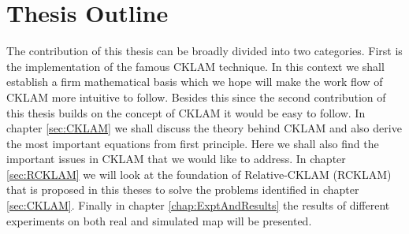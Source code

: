 \section{Thesis Outline}
The contribution of this thesis can be broadly divided into two categories. First is the implementation of the famous CKLAM technique. In this context we shall establish a firm mathematical basis which we hope will make the work flow of CKLAM more intuitive to follow. Besides this since the second contribution of this thesis builds on the concept of CKLAM it would be easy to follow. In chapter \ref {sec:CKLAM} we shall discuss the theory behind CKLAM and also derive the most important equations from first principle. Here we shall also find the important issues in CKLAM that we would like to address. In chapter \ref{sec:RCKLAM} we will look at the foundation of Relative-CKLAM (RCKLAM) that is proposed in this theses to solve the problems identified in chapter \ref{sec:CKLAM}. Finally in chapter \ref{chap:ExptAndResults} the results of different experiments on both real and simulated map will be presented.
